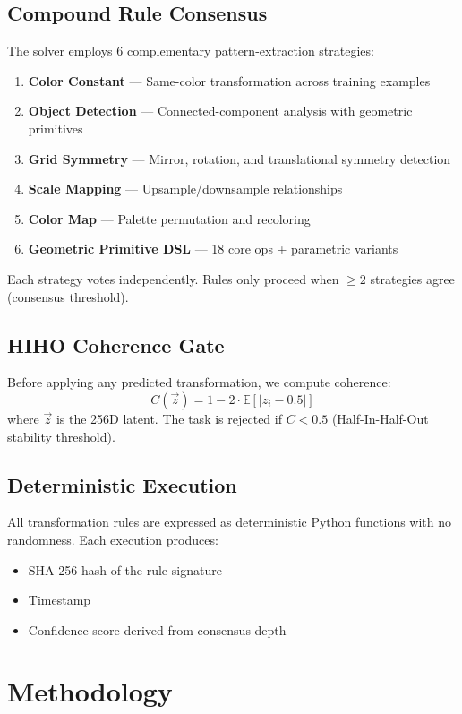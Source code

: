 \documentclass[11pt]{article}
\begin{document}
\subsection{Compound Rule Consensus}

The solver employs 6 complementary pattern-extraction strategies:

\begin{enumerate}
\item \textbf{Color Constant} — Same-color transformation across training examples
\item \textbf{Object Detection} — Connected-component analysis with geometric primitives
\item \textbf{Grid Symmetry} — Mirror, rotation, and translational symmetry detection
\item \textbf{Scale Mapping} — Upsample/downsample relationships
\item \textbf{Color Map} — Palette permutation and recoloring
\item \textbf{Geometric Primitive DSL} — 18 core ops + parametric variants
\end{enumerate}

Each strategy votes independently. Rules only proceed when $\geq 2$ strategies agree (consensus threshold).

\subsection{HIHO Coherence Gate}

Before applying any predicted transformation, we compute coherence:
\[ C(\vec{z}) = 1 - 2 \cdot \mathbb{E}[|z_i - 0.5|] \]
where $\vec{z}$ is the 256D latent. The task is rejected if $C < 0.5$ (Half-In-Half-Out stability threshold).

\subsection{Deterministic Execution}

All transformation rules are expressed as deterministic Python functions with no randomness. Each execution produces:
\begin{itemize}
\item SHA-256 hash of the rule signature
\item Timestamp
\item Confidence score derived from consensus depth
\end{itemize}

\section{Methodology}
\end{document}
